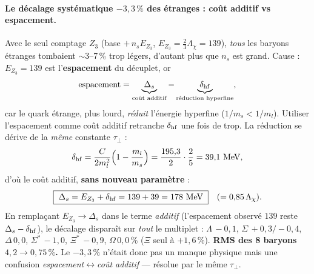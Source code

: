 \documentclass[11pt]{article}
\begin{document}
\paragraph{Le décalage systématique $-3{,}3\,\%$ des étranges : coût additif vs espacement.}
Avec le seul comptage $Z_3$ (base $+\,n_s E_{Z_3}$, $E_{Z_3}=\tfrac23\Lambda_\chi=139$), \emph{tous} les baryons étranges tombaient $\sim$3--7\,\% trop légers, d'autant plus que $n_s$ est grand. Cause : $E_{Z_3}=139$ est l'\textbf{espacement} du décuplet, or
\[
\text{espacement}=\underbrace{\Delta_s}_{\text{coût additif}}-\underbrace{\delta_{\rm hf}}_{\text{réduction hyperfine}},
\]
car le quark étrange, plus lourd, \emph{réduit} l'énergie hyperfine ($1/m_s<1/m_l$). Utiliser l'espacement comme coût additif retranche $\delta_{\rm hf}$ une fois de trop. La réduction se dérive de la \emph{même} constante $\tau_\perp$ :
\[
\delta_{\rm hf}=\frac{C}{2m_l^2}\Bigl(1-\frac{m_l}{m_s}\Bigr)=\frac{195{,}3}{2}\cdot\frac25=39{,}1~\text{MeV},
\]
d'où le coût additif, \textbf{sans nouveau paramètre} :
\[
\boxed{\;\Delta_s=E_{Z_3}+\delta_{\rm hf}=139+39=178~\text{MeV}\;}\quad(=0{,}85\,\Lambda_\chi).
\]
En remplaçant $E_{Z_3}\to\Delta_s$ dans le terme \emph{additif} (l'espacement observé $139$ reste $\Delta_s-\delta_{\rm hf}$), le décalage disparaît sur \emph{tout} le multiplet : $\Lambda\,{-}0{,}1$, $\Sigma\,{+}0{,}3/{-}0{,}4$, $\Delta\,0{,}0$, $\Sigma^*\,{-}1{,}0$, $\Xi^*\,{-}0{,}9$, $\Omega\,0{,}0$\,\% ($\Xi$ seul à $+1{,}6\,\%$). \textbf{RMS des 8 baryons $4{,}2\to0{,}75\,\%$.} Le $-3{,}3\,\%$ n'était donc pas un manque physique mais une confusion \emph{espacement}$\leftrightarrow$\emph{coût additif} --- résolue par le même $\tau_\perp$.
\end{document}
